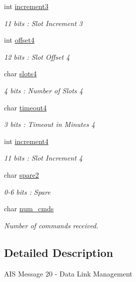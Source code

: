 \begin{DoxyCompactItemize}
int \mbox{\hyperlink{structaismsg__20_ad7d38fa9e8bca35e25329d1cf828a584}{increment3}}
\begin{DoxyCompactList}\small\item\em 11 bits \+: Slot Increment 3 \end{DoxyCompactList}\item 
int \mbox{\hyperlink{structaismsg__20_a7541d4e5c9f8ee304a30bb6c45eda969}{offset4}}
\begin{DoxyCompactList}\small\item\em 12 bits \+: Slot Offset 4 \end{DoxyCompactList}\item 
char \mbox{\hyperlink{structaismsg__20_a204e00f9808a37ce281487a3f67f4e6d}{slots4}}
\begin{DoxyCompactList}\small\item\em 4 bits \+: Number of Slots 4 \end{DoxyCompactList}\item 
char \mbox{\hyperlink{structaismsg__20_a8dac791855bd8ad2c16d510af2249a49}{timeout4}}
\begin{DoxyCompactList}\small\item\em 3 bits \+: Timeout in Minutes 4 \end{DoxyCompactList}\item 
int \mbox{\hyperlink{structaismsg__20_af0ae2176bbbab5923a2f54d7b591be4a}{increment4}}
\begin{DoxyCompactList}\small\item\em 11 bits \+: Slot Increment 4 \end{DoxyCompactList}\item 
char \mbox{\hyperlink{structaismsg__20_a8afbd0cd628f7a4a26298fe985064266}{spare2}}
\begin{DoxyCompactList}\small\item\em 0-\/6 bits \+: Spare \end{DoxyCompactList}\item 
char \mbox{\hyperlink{structaismsg__20_a09a00d39940d3c61ba519cc2733ff53f}{num\+\_\+cmds}}
\begin{DoxyCompactList}\small\item\em Number of commands received. \end{DoxyCompactList}\end{DoxyCompactItemize}


\subsection{Detailed Description}
A\+IS Message 20 -\/ Data Link Management 

